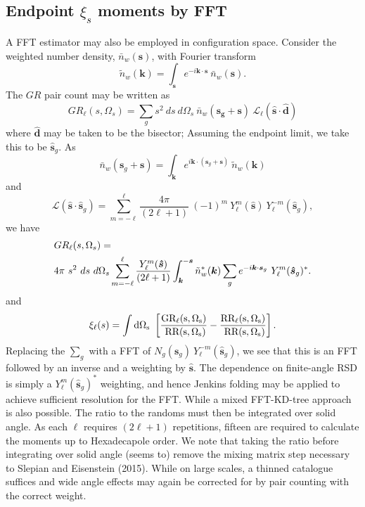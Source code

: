 \documentclass[useAMS,usenatbib]{mn2e}
\begin{document}
\subsection{Endpoint $\xi_s$ moments by FFT}
A FFT estimator may also be employed in configuration space.  Consider the weighted number density, $\bar n_w(\mathbf{s})$, with Fourier transform 
\begin{equation}
    \tilde n_w(\mathbf{k}) = \int_{\boldsymbol s} e^{-i \boldsymbol {k} \cdot \boldsymbol s} \ \bar n_w(\mathbf{s}).
\end{equation}
The $GR$ pair count may be written as 
\begin{equation}
    GR_{\ell}(s, \Omega_s) = \sum_g s^2 \ ds \ d \Omega_s \ \bar n_w(\mathbf{\boldsymbol{s}_g + \boldsymbol s}) \ \mathcal{L}_\ell (\boldsymbol {\hat s} \cdot \boldsymbol{\hat d})
\end{equation}
where $\boldsymbol{\hat d}$ may be taken to be the bisector; Assuming the endpoint limit, we take this to be $\boldsymbol{\hat s}_g$.  As 
\begin{equation}
    \bar n_w(\boldsymbol{s}_g + \boldsymbol{s}) = \int_{\boldsymbol k} e^{i \boldsymbol {k} \cdot (\boldsymbol{s}_g + \boldsymbol{s})} \ \tilde n_w(\mathbf{k})
\end{equation}
and
\begin{equation}
    \mathcal{L}(\boldsymbol{\hat s} \cdot \boldsymbol{\hat s}_g) = \sum_{m=-\ell}^{\ell} \frac{4 \pi}{(2 \ell + 1)} \ (-1)^m \ Y^{m}_{\ell}(\boldsymbol {\hat s}) \ Y^{-m}_{\ell}(\boldsymbol{\hat s}_g),
\end{equation}
we have 
\begin{align}
&GR_{\ell}(s, \Omega_s) = \notag \\ 
& 4 \pi \ s^2 \ ds \ d \Omega_s \sum_{m=-\ell}^{\ell} \frac{Y^{m}_{\ell}(\boldsymbol{\hat s})}{(2 \ell + 1)} \int_{\boldsymbol k}^{- \boldsymbol{s}} \tilde n^{*}_w(\boldsymbol k) \sum_g e^{-i \boldsymbol{k} \cdot \boldsymbol s_g} \ Y_\ell^{m}(\boldsymbol{\hat s}_g){}^{*}.
\end{align}
and 
\begin{equation}
    \xi_{\ell}(s) = \int \rm{d} \Omega_s \ \left [ \frac{GR_{\ell}(s, \Omega_s)}{\ RR(s, \Omega_s)} - \frac{RR_{\ell}(s, \Omega_s)}{\ RR(s, \Omega_s)} \right ].
\end{equation}
Replacing the $\sum_g$ with a FFT of $N_g(\boldsymbol{s}_g) \ Y_\ell^{-m} (\boldsymbol{\hat s}_g)$, we see that this is an FFT followed by an inverse and a weighting by $\boldsymbol{\hat s}$.  The dependence on finite-angle RSD is simply a $Y_{\ell}^m(\boldsymbol{\hat s}_g)^*$ weighting, and hence Jenkins folding may be applied to achieve sufficient resolution for the FFT.  While a mixed FFT-KD-tree approach is also possible.  The ratio to the randoms must then be integrated over solid angle.  As each $\ell$ requires $(2 \ell + 1)$ repetitions, fifteen are required to calculate the moments up to Hexadecapole order.  We note that taking the ratio before integrating over solid angle (seems to) remove the mixing matrix step necessary to Slepian and Eisenstein (2015).  While on large scales, a thinned catalogue suffices and wide angle effects may again be corrected for by pair counting with the correct weight. 
\end{document}
